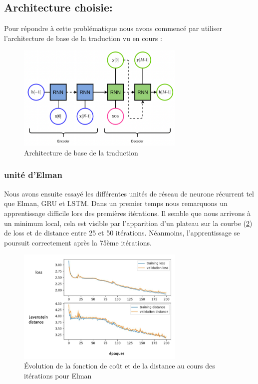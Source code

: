 \subsection{Architecture choisie:}
    Pour répondre à cette problématique nous avons commencé par utiliser l'architecture de base de la traduction vu en cours :
    \begin{figure}[!ht]
        \centering
        \includegraphics[width=80mm]{sections/images/architecture/traduction.png}
        \caption{Architecture de base de la traduction}
        \label{fig:Figure 2  }
    \end{figure}
    
    
    \subsubsection{unité d'Elman}
        Nous avons ensuite essayé les différentes unités de réseau de neurone récurrent tel que Elman, GRU et LSTM. Dans un premier temps nous remarquons un apprentissage difficile lors des premières itérations. Il semble que nous arrivons à un minimum local, cela est visible par l'apparition d'un plateau sur la courbe (\ref{fig:Figure 3  }) de loss et de distance entre 25 et 50 itérations. Néanmoins, l'apprentissage se poursuit correctement après la 75ème itérations.
    
        \begin{figure}[!ht]
        \centering
        \includegraphics[width=80mm]{sections/images/architecture/RNN.png}
        \caption{Évolution de la fonction de coût et de la distance au cours des itérations pour Elman}
        \label{fig:Figure 3  }
        \end{figure}
        
